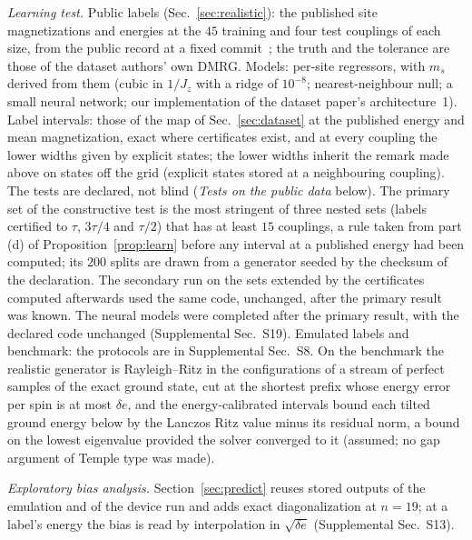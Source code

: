 \documentclass[aps,prx,twocolumn,10pt,superscriptaddress,nofootinbib,longbibliography,floatfix]{revtex4-2}
\theoremstyle{remark}
\newcommand{\Jz}{J_z}
\newcommand{\ms}{m_s}
\newcommand{\de}{\delta e}
\begin{document}
\emph{Learning test.} Public labels (Sec.~\ref{sec:realistic}): the published site magnetizations and energies at the
$45$ training and four test couplings of each size, from the public record at a fixed commit~\cite{jaderberg2026data}; %
the truth and the tolerance are those of the dataset authors' own DMRG. Models: per-site regressors, with $\ms$ derived
from them (cubic in $1/\Jz$ with a ridge of $10^{-8}$; nearest-neighbour null; a small neural network; our implementation of the dataset paper's architecture~1). Label %
intervals: those of the map of Sec.~\ref{sec:dataset} at the published energy and mean magnetization, exact where
certificates exist, and at every coupling the lower widths given by explicit states; the lower widths inherit the
remark made above on states off the grid (explicit states stored at a neighbouring coupling). The tests are declared,
not blind (\emph{Tests on the public data} below). The primary set of the constructive test is the most stringent
of three nested sets (labels certified to $\tau$, $3\tau/4$ and $\tau/2$) that has at least $15$ couplings, a rule %
taken from part (d) of Proposition~\ref{prop:learn} before any interval at a published energy had been computed;
its $200$ splits are drawn from a generator seeded by the checksum of the declaration. The secondary run on the sets extended by the %
certificates computed afterwards used the same code, unchanged, after the primary result was known. The neural
models were completed after the primary result, with the declared code unchanged (Supplemental Sec.~S19).
Emulated labels and benchmark: the protocols are in Supplemental Sec.~S8. On the benchmark the realistic
generator is Rayleigh--Ritz in the configurations of a stream of perfect samples of the exact ground state, cut
at the shortest prefix whose energy error per spin is at most $\de$, and the energy-calibrated intervals bound
each tilted ground energy below by the Lanczos Ritz value minus its residual norm, a bound on the lowest
eigenvalue provided the solver converged to it (assumed; no gap argument of Temple type was made).

\emph{Exploratory bias analysis.} Section~\ref{sec:predict} reuses stored outputs of the emulation and of the device
run and adds exact diagonalization at $n=19$; at a label's energy the bias is read by interpolation in %
$\sqrt{\de}$ (Supplemental Sec.~S13).
\end{document}
